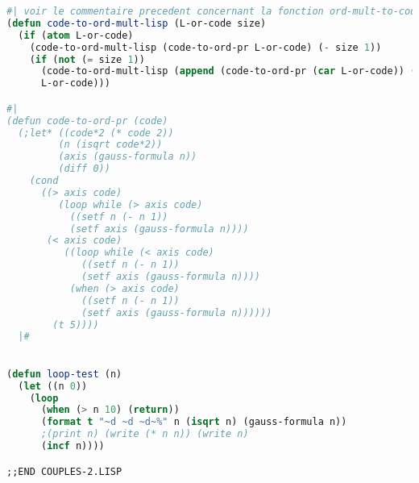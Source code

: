 \documentclass{article}
\begin{document}
\begin{lstlisting}[language=Lisp]
#| voir le commentaire precedent concernant la fonction ord-mult-to-code-lisp |#
(defun code-to-ord-mult-lisp (L-or-code size)
  (if (atom L-or-code)
    (code-to-ord-mult-lisp (code-to-ord-pr L-or-code) (- size 1))
    (if (not (= size 1))
      (code-to-ord-mult-lisp (append (code-to-ord-pr (car L-or-code)) (cdr L-or-code)) (- size 1))
      L-or-code)))

#|
(defun code-to-ord-pr (code)
  (;let* ((code*2 (* code 2))
         (n (isqrt code*2))
         (axis (gauss-formula n))
         (diff 0))
    (cond 
      ((> axis code)
         (loop while (> axis code)
           ((setf n (- n 1)) 
           (setf axis (gauss-formula n))))
       (< axis code)
          ((loop while (< axis code)
             ((setf n (- n 1)) 
             (setf axis (gauss-formula n))))
           (when (> axis code)
             ((setf n (- n 1))
             (setf axis (gauss-formula n))))))
        (t 5))))
  |#           
  

(defun loop-test (n)
  (let ((n 0))
    (loop
      (when (> n 10) (return))
      (format t "~d ~d ~d~%" n (isqrt n) (gauss-formula n))
      ;(print n) (write (* n n)) (write n)
      (incf n))))

;;END COUPLES-2.LISP

\end{lstlisting}
\end{document}

